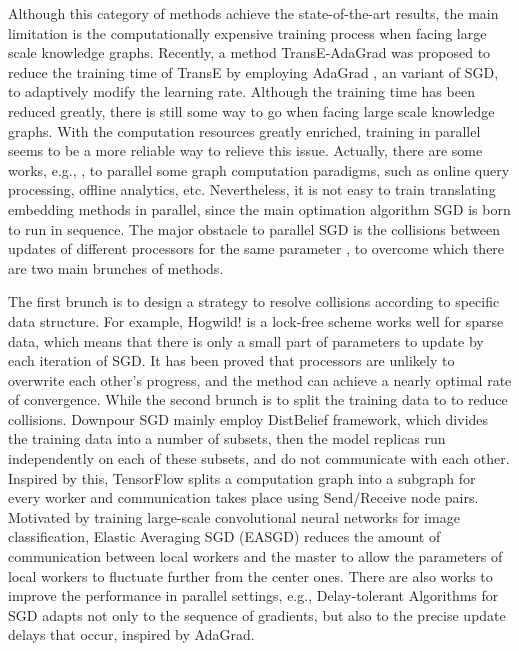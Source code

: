 \documentclass[sigconf]{acmart}
\begin{document}
Although this category of methods achieve the state-of-the-art results, the main limitation is the computationally expensive training process when facing large scale knowledge graphs. Recently, a method TransE-AdaGrad \cite{minervini2015efficient} was proposed to reduce the training time of TransE by employing  AdaGrad \cite{duchi2011adaptive}, an variant of SGD, to adaptively modify the learning rate. Although the training time has been reduced greatly, there is still some way to go when facing large scale knowledge graphs.
With the computation resources greatly enriched, training in parallel seems to be a more reliable way to relieve this issue. Actually, there are some works, e.g., \cite{shaoparallel}, to parallel some graph computation paradigms, such as online query processing, offline analytics, etc.  Nevertheless, it is not easy to train translating embedding methods in parallel, since the main optimation algorithm SGD is born to run in sequence. 
The major obstacle to parallel SGD is the collisions between updates of different processors for the same parameter \cite{Ruder2016An},  to overcome which there are two main brunches of methods. 

The first brunch is to design a strategy to resolve collisions according to specific data structure. For example, Hogwild! \cite{recht2011hogwild} is a lock-free scheme works well for sparse data, which means that there is only a small part of parameters to update by each iteration of SGD. It has been proved that processors are unlikely to overwrite each other's progress, and the method can achieve a nearly optimal rate of convergence.
While the second brunch is to split the training data to to reduce collisions. Downpour SGD \cite{Dean2012Large}  mainly employ DistBelief  \cite{Dean2012Large} framework, which divides the training data into a number of subsets, then the model replicas run independently on each of these subsets, and do not communicate with each other.
Inspired by this, TensorFlow \cite{Abadi2016TensorFlow} splits a computation graph into a subgraph for every worker and communication takes place using Send/Receive node pairs. 
Motivated by training large-scale convolutional neural networks for image classification, Elastic Averaging SGD (EASGD) \cite{Zhang2015Deep} reduces the amount of communication between local workers and the master to allow the parameters of local workers to fluctuate further from the center ones. 
There are also works to improve the performance in parallel settings, e.g.,  Delay-tolerant Algorithms for SGD \cite{Mcmahan2014Delay} adapts not only to the sequence of gradients, but also to the precise update delays that occur, inspired by AdaGrad.
\end{document}
